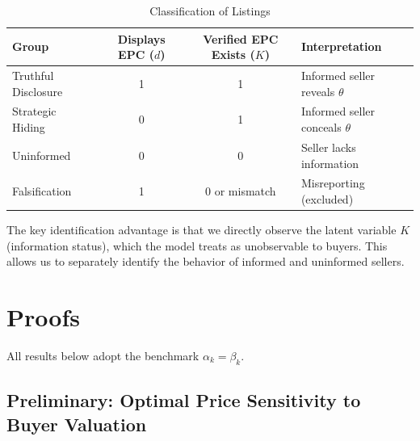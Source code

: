 \documentclass[10pt,letterpaper]{bp-template-concise}
\begin{document}
\begin{table}[H]
\centering
\caption{Classification of Listings}
\label{tab:listing_types}
\renewcommand{\arraystretch}{1.4}
\begin{tabular}{lccl}
\toprule
\toprule
\textbf{Group} & \textbf{Displays EPC} ($d$) & \textbf{Verified EPC Exists} ($K$) & \textbf{Interpretation} \\
\midrule
Truthful Disclosure & 1 & 1 & Informed seller reveals $\theta$ \\
Strategic Hiding & 0 & 1 & Informed seller conceals $\theta$ \\
Uninformed & 0 & 0 & Seller lacks information \\
Falsification & 1 & 0 or mismatch & Misreporting (excluded) \\
\bottomrule
\bottomrule
\end{tabular}
\end{table}

The key identification advantage is that we directly observe the latent variable $K$ (information status), which the model treats as unobservable to buyers. This allows us to separately identify the behavior of informed and uninformed sellers.


\section{Proofs}
\label{app:proofs}

All results below adopt the benchmark $\alpha_k=\beta_k$.

\subsection*{Preliminary: Optimal Price Sensitivity to Buyer Valuation}
\end{document}
